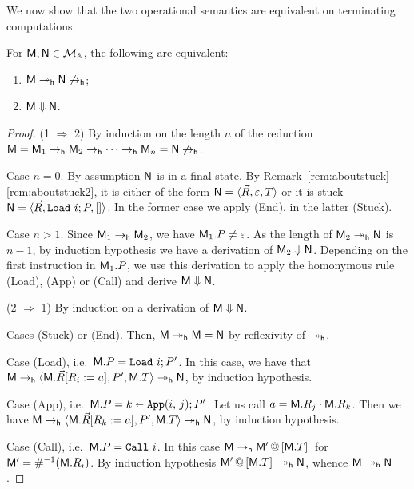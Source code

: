 We now show that the two operational semantics are equivalent on terminating computations.

\begin{prop}\label{prop:equivsem}
For $\mM,\mN\in\cM$, the following are equivalent:
\begin{enumerate}
\item $\mM\reddh \mN\not\redh$;
\item $\mM\goesto\mN$.
\end{enumerate}
\end{prop}

\begin{proof}
(1 $\Rightarrow$ 2) By induction on the length $n$ of the reduction $\mM=\mM_1\redh\mM_2\redh\cdots\redh \mM_n=\mN\not\redh$.

Case $n = 0$. By assumption $\mN$ is in a final state. By Remark~\ref{rem:aboutstuck}\ref{rem:aboutstuck2}, it is either of the form $\mN = \tuple{\vec R,\varepsilon,T}$ or it is stuck $\mN = \tuple{\vec R,\Load i;P,[]}$. In the former case we apply (\textrm{End}), in the latter (\textrm{Stuck}).

Case $n > 1$. Since $\mM_1\redh \mM_2$, we have $\mM_1.P\neq\varepsilon$.
As the length of $\mM_2\reddh \mN$ is $n-1$, by induction hypothesis we have a derivation of $\mM_2\goesto \mN$.
Depending on the first instruction in $\mM_1.P$, we use this derivation to apply the homonymous rule (Load), (App) or (Call) and derive $\mM\goesto \mN$.

(2 $\Rightarrow$ 1) By induction on a derivation of $\mM\goesto \mN$.

Cases (Stuck) or (End). Then, $\mM\reddh\mM=\mN$ by reflexivity of $\reddh$.

Case (Load), i.e.\ $\mM.P=\Load i;P'$. In this case, we have that $\mM\redh \tuple{\mM.\vec R\repl{R_i}{a},P',\mM.T}\reddh \mN$, by induction hypothesis.

Case (App), i.e.\ $\mM.P=\Apply ijk;P'$. Let us call $a = \App{\mM.R_j}{\mM.R_k}$. Then we have $\mM\redh \tuple{\mM.\vec R\repl{R_k}{a},P',\mM.T}\reddh \mN$, by induction hypothesis.

Case (Call), i.e.\ $\mM.P = \Call i$. In this case $\mM\redh \append{\mM'}{\mM.T}$ for $\mM' = \Lookinv{\mM.R_i}$. By induction hypothesis $\append{\mM'}{\mM.T}\reddh \mN$, whence $\mM\reddh \mN$.
\end{proof}

